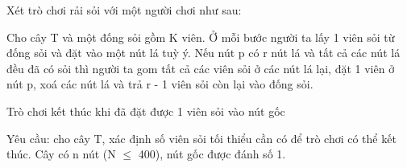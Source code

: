 Xét trò chơi rải sỏi với một người chơi như sau:

Cho cây T và một đống sỏi gồm K viên. Ở mỗi bước người ta lấy 1 viên sỏi từ đống sỏi và đặt vào một nút lá tuỳ ý. Nếu nút p có r nút lá và tất cả các nút lá đều đã có sỏi thì người ta gom tất cả các viên sỏi ở các nút lá lại, đặt 1 viên ở nút p, xoá các nút lá và trả r - 1 viên sỏi còn lại vào đống sỏi.

Trò chơi kết thúc khi đã đặt được 1 viên sỏi vào nút gốc

Yêu cầu: cho cây T, xác định số viên sỏi tối thiểu cần có để trò chơi có thể kết thúc. Cây có n nút (N  $\le$  400), nút gốc được đánh số 1.
